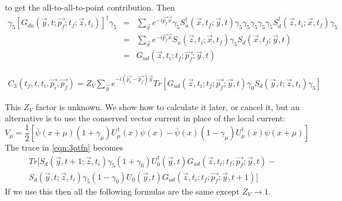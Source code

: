 \documentclass[3p,preprint]{elsarticle}
\begin{document}
to get the all-to-all-to-point contribution. Then
\begin{eqnarray}
\gamma_5 \left[ G_{du}(\vec{y}, t; \vec{p_f}; t_f; \vec{z}, t_i)  \right]^\dagger \gamma_5 &=& \sum_{ \vec{x} } e^{-i\vec{p_f} \vec{x}} \gamma_5 S_u^\dagger (\vec{x}, t_f;\vec{y},t ) \gamma_5 \gamma_5 \gamma_5 \gamma_5 \gamma_5 S_d^\dagger (\vec{z}, t_i;\vec{x}, t_f) \gamma_5 \\
&=& \sum_{ \vec{x} } e^{-i\vec{p_f} \vec{x}} S_u (\vec{z}, t_i;\vec{x}, t_f) \gamma_5 S_d (\vec{x}, t_f;\vec{y},t ) \\
&=& G_{ud}(\vec{z}, t_i; t_f; \vec{p_f}; \vec{y}, t )
\end{eqnarray}

\begin{eqnarray}\label{eqn:3ptfn}
C_3(t_f,t,t_i, \vec{p_i}, \vec{p_f}) = Z_V \sum_{\vec{y} } e^{-i(\vec{p_i} - \vec{p_f})\vec{y}} Tr \left[ G_{ud}(\vec{z}, t_i; t_f; \vec{p_f}; \vec{y}, t )  \gamma_0 S_d(\vec{y},t;\vec{z},t_i) \gamma_5 \right]
\end{eqnarray}

This $Z_V$ factor is unknown. We show how to calculate it later, or cancel it, but an alternative is to use the conserved
vector current in place of the local current:
\begin{equation}
V_\mu = \frac{1}{2} \left[ \bar{\psi}(x + \mu)(1 + \gamma_\mu)U_\mu^\dagger(x) \psi(x) - \bar{\psi}(x)(1 - \gamma_\mu)U_\mu^\dagger(x) \psi(x + \mu) \right]
\end{equation}
The trace in \ref{eqn:3ptfn} becomes
\begin{eqnarray}
Tr[ S_d(\vec{y},t+1;\vec{z},t_i) \gamma_5 (1 + \gamma_0)U_0^\dagger(\vec{y},t) G_{ud}(\vec{z}, t_i; t_f; \vec{p_f}; \vec{y}, t )   - \\ \nonumber
S_d(\vec{y},t;\vec{z},t_i) \gamma_5 (1 - \gamma_0)U_0(\vec{y},t) G_{ud}(\vec{z}, t_i; t_f; \vec{p_f}; \vec{y}, t+1 ) ]
\end{eqnarray}
If we use this then all the following formulas are the same except $Z_V \rightarrow 1$.
\end{document}
